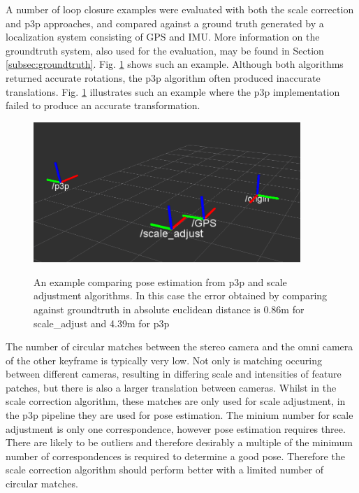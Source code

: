 A number of loop closure examples were evaluated with both the scale correction and p3p approaches, and compared against a ground truth generated by a localization system consisting of GPS and IMU.  More information on the groundtruth system, also used for the evaluation, may be found in Section \ref{subsec:groundtruth}.  Fig. \ref{fig:scale_vs_p3p} shows such an example.  Although both algorithms returned accurate rotations, the p3p algorithm often produced inaccurate translations.  Fig. \ref{fig:scale_vs_p3p} illustrates such an example where the p3p implementation failed to produce an accurate transformation. 

\begin{figure}[h]
  \centering
    \includegraphics[width=0.9\textwidth]{chapters/images/scale_vs_p3p_1}\\
  \caption{An example comparing pose estimation from p3p and scale adjustment algorithms.  In this case the error obtained by comparing against groundtruth in absolute euclidean distance is 0.86m for scale\_adjust and 4.39m for p3p}
  \label{fig:scale_vs_p3p}
\end{figure}

The number of circular matches between the stereo camera and the omni camera of the other keyframe is typically very low.  Not only is matching occuring between different cameras, resulting in differing scale and intensities of feature patches, but there is also a larger translation between cameras. Whilst in the scale correction algorithm, these matches are only used for scale adjustment, in the p3p pipeline they are used for pose estimation.  The minium number for scale adjustment is only one correspondence, however pose estimation requires three.  There are likely to be outliers and therefore desirably a multiple of the minimum number of correspondences is required to determine a good pose.  Therefore the scale correction algorithm should perform better with a limited number of circular matches. 

